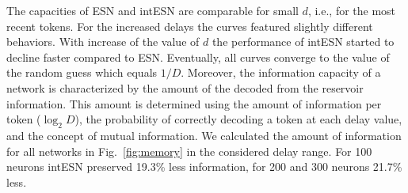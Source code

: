 The capacities of ESN and intESN  are comparable for small $d$, i.e., for the most recent tokens. 
For the increased delays the curves featured slightly different behaviors. 
With increase of the value of $d$ the performance of intESN started to decline faster compared to ESN.
Eventually, all curves converge to the value of the random guess which equals $1/D$. 
Moreover, the information capacity of a network is characterized by the amount of the decoded from the reservoir information.
This amount is determined using the amount of information per token ($\log_2D$), the probability of correctly decoding a token at each delay value, and the concept of mutual information. We calculated the amount of information for all networks in Fig.~\ref{fig:memory} in the considered delay range. For 100 neurons intESN preserved 19.3\% less information, for 200 and 300 neurons 21.7\% less.















